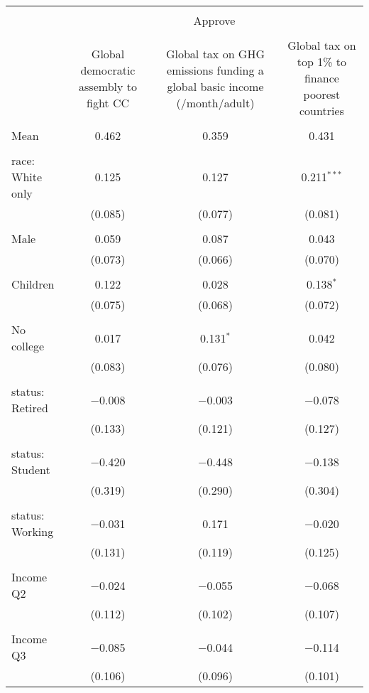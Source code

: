 
\begin{tabular}{@{\extracolsep{5pt}}lccc} 
\\[-1.8ex]\hline 
\hline \\[-1.8ex] 
 & \multicolumn{3}{c}{Approve} \\ 
\cline{2-4} 
\\[-1.8ex] & Global democratic assembly to fight CC & Global tax on GHG emissions funding a global basic income (\textdollar 30/month/adult) & Global tax on top 1\% to finance poorest countries \\ 
\hline \\[-1.8ex] 
 Mean & 0.462 & 0.359 & 0.431  \\ \hline \\[-1.8ex] race: White only & 0.125 & 0.127 & 0.211$^{***}$ \\ 
  & (0.085) & (0.077) & (0.081) \\ 
  & & & \\ 
 Male & 0.059 & 0.087 & 0.043 \\ 
  & (0.073) & (0.066) & (0.070) \\ 
  & & & \\ 
 Children & 0.122 & 0.028 & 0.138$^{*}$ \\ 
  & (0.075) & (0.068) & (0.072) \\ 
  & & & \\ 
 No college & 0.017 & 0.131$^{*}$ & 0.042 \\ 
  & (0.083) & (0.076) & (0.080) \\ 
  & & & \\ 
 status: Retired & $-$0.008 & $-$0.003 & $-$0.078 \\ 
  & (0.133) & (0.121) & (0.127) \\ 
  & & & \\ 
 status: Student & $-$0.420 & $-$0.448 & $-$0.138 \\ 
  & (0.319) & (0.290) & (0.304) \\ 
  & & & \\ 
 status: Working & $-$0.031 & 0.171 & $-$0.020 \\ 
  & (0.131) & (0.119) & (0.125) \\ 
  & & & \\ 
 Income Q2 & $-$0.024 & $-$0.055 & $-$0.068 \\ 
  & (0.112) & (0.102) & (0.107) \\ 
  & & & \\ 
 Income Q3 & $-$0.085 & $-$0.044 & $-$0.114 \\ 
  & (0.106) & (0.096) & (0.101) \\ 

\end{tabular}
